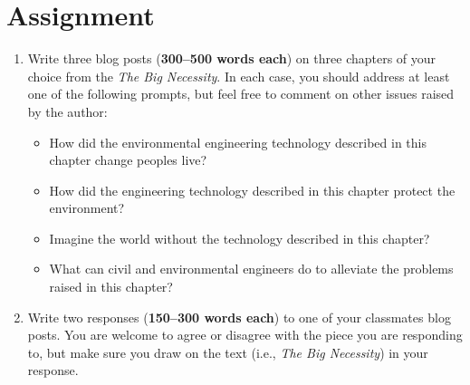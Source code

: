 \documentclass[12pt,letterpaper]{article}
\begin{document}
\section *{Assignment}
\begin{enumerate}
\item Write three blog posts (\textbf{300--500 words each}) on three chapters of your choice from the \emph{The Big Necessity}.  In each case, you should address at least one of the following prompts, but feel free to comment on other issues raised by the author:

\begin{itemize}
\item How did the environmental engineering technology described in this chapter change peoples live?
\item How did the engineering technology described in this chapter protect the environment?
\item Imagine the world without the technology described in this chapter?
\item What can civil and environmental engineers do to alleviate  the problems raised in this chapter?
\end{itemize}

\item Write two responses (\textbf{150--300 words each}) to one of your classmates blog posts.  You are welcome to agree or disagree with the piece you are responding to, but make sure you draw on the text (i.e., \emph{The Big Necessity}) in your response. 

\end{enumerate}
\end{document}
